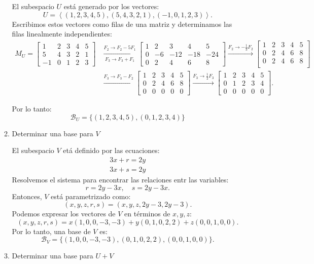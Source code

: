 \begin{enumerate}[label=\color{red}\textbf{\arabic*)}]
\begin{enumerate}[label=Paso \arabic*:]
        El subespacio  $U$ está generado por los vectores: \[
        U=\left<(1,2,3,4,5),(5,4,3,2,1),(-1,0,1,2,3) \right>.
        \] 
        Escribimos estos vectores como filas de una matriz y determinamos las filas linealmente independientes: \[
\begin{aligned}
        M_U=\begin{bmatrix} 
            1 & 2 & 3 & 4 & 5\\
            5 & 4 & 3 & 2 & 1\\
            -1 & 0 & 1 & 2 & 3
        \end{bmatrix}&\xrightarrow[F_3\to F_3+F_1]{F_2\to F_2-5F_1}\begin{bmatrix} 
            1 & 2 & 3 & 4 & 5\\
            0 & -6 & -12 & -18 & -24\\
            0 & 2 & 4 & 6 & 8
        \end{bmatrix}\xrightarrow{F_2\to -\frac{1}{3} F_2}\begin{bmatrix} 
            1 & 2 & 3 & 4 & 5\\
            0 & 2 & 4 & 6 & 8\\
            0 & 2 & 4 & 6 & 8\\
        \end{bmatrix}\\ & \xrightarrow{F_3\to F_3-F_2}\begin{bmatrix} 
            1 & 2 & 3 & 4 & 5\\
            0 & 2 & 4 & 6 & 8\\
            0 & 0 & 0 & 0 & 0
        \end{bmatrix} \xrightarrow{F_{3}\to \frac{1}{2} F_3} \begin{bmatrix} 
            1 & 2 & 3 & 4 & 5\\
            0 & 1 & 2 & 3 & 4\\
            0 & 0 & 0 & 0 & 0
        \end{bmatrix}  .
\end{aligned}
        \] 

        Por lo tanto: \[
        \mathcal{B}_U=\{(1,2,3,4,5),(0,1,2,3,4)\} 
        \] 
    \item Determinar una base para $V$

        El subespacio  $V$ etá definido por las ecuaciones:  \[
        \begin{array}{l}
            3x+r=2y\\
            3x+s=2y
        \end{array}
        \] 
        Resolvemos el sistema para encontrar las relaciones entr las variables: \[
        r=2y-3x,\quad s=2y-3x.
        \] 
        Entonces, $V$ está parametrizado como:  \[
            (x,y,z,r,s)=(x,y,z,2y-3,2y-3).
        \] 
        Podemos expresar los vectores de $V$ en términos de  $x,y,z$:  \[
            (x,y,z,r,s)=x(1,0,0,-3,-3)+y(0,1,0,2,2)+z(0,0,1,0,0).
        \] 
        Por lo tanto, una base de $V$ es:  \[
        \mathcal{B}_V=\{(1,0,0,-3,-3),(0,1,0,2,2),(0,0,1,0,0)\} .
        \] 
    \item Determinar una base para $U+V$


\end{enumerate}
\end{enumerate}
